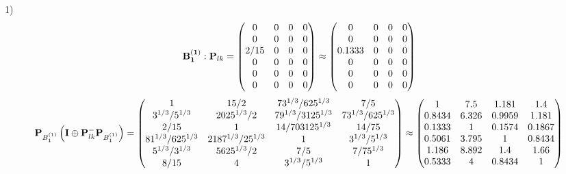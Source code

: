\documentclass[10pt,a4paper]{article}
\begin{document}
	1)
	\[
		\bold{B_1^{(1)}}: \bold{P}_{lk} = 
		\begin{pmatrix}
			{{0}}{} & {{0}}{} & {{0}}{} & {{0}}{} \\
			{{0}}{} & {{0}}{} & {{0}}{} & {{0}}{} \\
			{{2}} / {{15}} & {{0}}{} & {{0}}{} & {{0}}{} \\
			{{0}}{} & {{0}}{} & {{0}}{} & {{0}}{} \\
			{{0}}{} & {{0}}{} & {{0}}{} & {{0}}{} \\
			{{0}}{} & {{0}}{} & {{0}}{} & {{0}}{} \\
		\end{pmatrix}
		\approx
		\begin{pmatrix}
			0        & 0        & 0        & 0        \\
			0        & 0        & 0        & 0        \\
			0.1333   & 0        & 0        & 0        \\
			0        & 0        & 0        & 0        \\
			0        & 0        & 0        & 0        \\
			0        & 0        & 0        & 0        \\
		\end{pmatrix}
	\]
	\[
		\bold{P}_{B_1^{(1)}}\left(\bold{I} \oplus \bold{P}_{lk}^{-}\bold{P}_{B_1^{(1)}}\right) = 
		\begin{pmatrix}
			{1}{} & {{15}} / {{2}} & {{7}{3^ {1 / 3}}} / {{625^ {1 / 3}}} & {{7}} / {{5}} \\
			{{3^ {1 / 3}}} / {{5^ {1 / 3}}} & {{2025^ {1 / 3}}} / {{2}} & {{7}{9^ {1 / 3}}} / {{3125^ {1 / 3}}} & {{7}{3^ {1 / 3}}} / {{625^ {1 / 3}}} \\
			{{2}} / {{15}} & {1}{} & {{14}} / {{703125^ {1 / 3}}} & {{14}} / {{75}} \\
			{{81^ {1 / 3}}} / {{625^ {1 / 3}}} & {{2187^ {1 / 3}}} / {{2}{5^ {1 / 3}}} & {1}{} & {{3^ {1 / 3}}} / {{5^ {1 / 3}}} \\
			{{5^ {1 / 3}}} / {{3^ {1 / 3}}} & {{5625^ {1 / 3}}} / {{2}} & {{7}} / {{5}} & {{7}} / {{75^ {1 / 3}}} \\
			{{8}} / {{15}} & {{4}}{} & {{3^ {1 / 3}}} / {{5^ {1 / 3}}} & {1}{} \\
		\end{pmatrix}
		\approx
		\begin{pmatrix}
			1        & 7.5      & 1.181    & 1.4      \\
			0.8434   & 6.326    & 0.9959   & 1.181    \\
			0.1333   & 1        & 0.1574   & 0.1867   \\
			0.5061   & 3.795    & 1        & 0.8434   \\
			1.186    & 8.892    & 1.4      & 1.66     \\
			0.5333   & 4        & 0.8434   & 1        \\
		\end{pmatrix}
	\]
\end{document}
